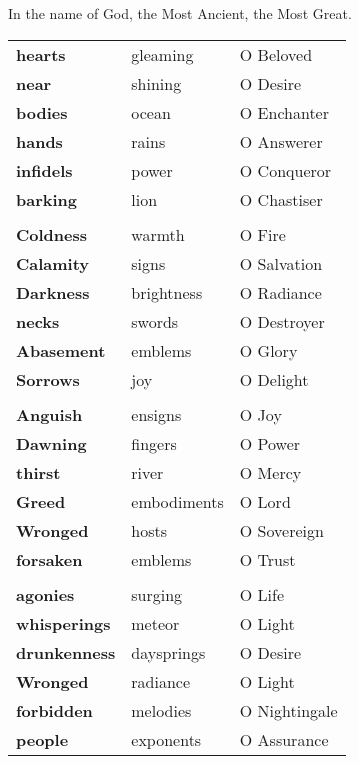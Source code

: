\documentclass[14pt]{extarticle}
\begin{document}
\newpage

\begin{hafez}{}{}
  In the name of God, the Most Ancient, the Most Great.

  \begin{tabular}{|l|l|l|}
  \hline
  \textbf{hearts}      & gleaming    & O Beloved     \\
  \textbf{near}        & shining     & O Desire      \\
  \textbf{bodies}      & ocean       & O Enchanter   \\
  \textbf{hands}       & rains       & O Answerer    \\
  \textbf{infidels}    & power       & O Conqueror   \\
  \textbf{barking}     & lion        & O Chastiser   \\ \hline

  \multicolumn{3}{c}{}           \\ \hline
  \textbf{Coldness}    & warmth      & O Fire        \\
  \textbf{Calamity}    & signs       & O Salvation   \\
  \textbf{Darkness}    & brightness  & O Radiance    \\
  \textbf{necks}       & swords      & O Destroyer   \\
  \textbf{Abasement}   & emblems     & O Glory       \\
  \textbf{Sorrows}     & joy         & O Delight     \\ \hline

  \multicolumn{3}{c}{}           \\ \hline
  \textbf{Anguish}     & ensigns     & O Joy         \\
  \textbf{Dawning}     & fingers     & O Power       \\
  \textbf{thirst}      & river       & O Mercy       \\
  \textbf{Greed}       & embodiments & O Lord        \\
  \textbf{Wronged}     & hosts       & O Sovereign   \\
  \textbf{forsaken}    & emblems     & O Trust       \\ \hline

  \multicolumn{3}{c}{}           \\ \hline
  \textbf{agonies}     & surging     & O Life        \\
  \textbf{whisperings} & meteor      & O Light       \\
  \textbf{drunkenness} & daysprings  & O Desire      \\
  \textbf{Wronged}     & radiance    & O Light       \\
  \textbf{forbidden}   & melodies    & O Nightingale \\
  \textbf{people}      & exponents   & O Assurance   \\ \hline


\end{tabular}
\end{hafez}
\end{document}
